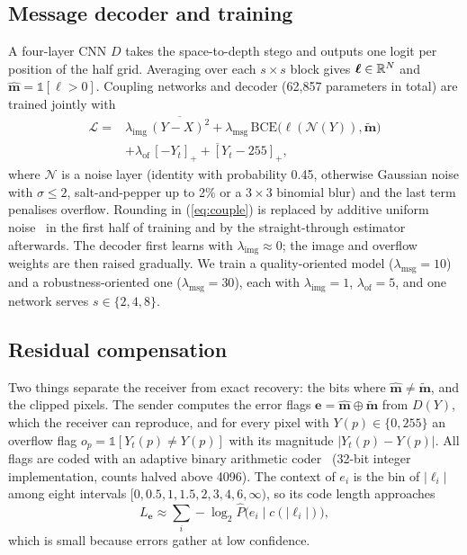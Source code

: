 \subsection{Message decoder and training}
A four-layer CNN $D$ takes the space-to-depth stego and outputs one logit per position of the half grid. Averaging over
each $s\times s$ block gives $\boldsymbol\ell\in\mathbb{R}^N$ and $\hat{\mathbf m}=\mathbb 1[\boldsymbol\ell>0]$. Coupling
networks and decoder (62{,}857 parameters in total) are trained jointly with
\begin{equation}
\begin{aligned}
\mathcal L ={}& \lambda_{\mathrm{img}}\,\overline{(Y-X)^2}
 + \lambda_{\mathrm{msg}}\,\mathrm{BCE}\big(\boldsymbol\ell(\mathcal N(Y)),\tilde{\mathbf m}\big)\\
 &+ \lambda_{\mathrm{of}}\,\overline{[-Y_t]_+ + [Y_t-255]_+},
\end{aligned}
\label{eq:loss}
\end{equation}
where $\mathcal N$ is a noise layer (identity with probability 0.45, otherwise Gaussian noise with
$\sigma\le 2$, salt-and-pepper up to 2\% or a $3\times3$ binomial blur) and the last term penalises overflow. Rounding
in (\ref{eq:couple}) is replaced by additive uniform noise~\cite{balle2017} in the first half of training and by the
straight-through estimator afterwards. The decoder first learns with $\lambda_{\mathrm{img}}\approx0$; the image and
overflow weights are then raised gradually. We train a quality-oriented model ($\lambda_{\mathrm{msg}}=10$) and a
robustness-oriented one ($\lambda_{\mathrm{msg}}=30$), each with $\lambda_{\mathrm{img}}=1$, $\lambda_{\mathrm{of}}=5$, and
one network serves $s\in\{2,4,8\}$.

\subsection{Residual compensation}
Two things separate the receiver from exact recovery: the bits where $\hat{\mathbf m}\neq\tilde{\mathbf m}$, and the
clipped pixels. The sender computes the error flags $\mathbf e=\hat{\mathbf m}\oplus\tilde{\mathbf m}$ from $D(Y)$, which the
receiver can reproduce, and for every pixel with $Y(p)\in\{0,255\}$ an overflow flag
$o_p=\mathbb 1[Y_t(p)\neq Y(p)]$ with its magnitude $|Y_t(p)-Y(p)|$. All flags are coded with an adaptive binary
arithmetic coder~\cite{witten1987ac} (32-bit integer implementation, counts halved above 4096). The context of $e_i$ is the bin of $|\ell_i|$ among eight intervals
$[0,0.5,1,1.5,2,3,4,6,\infty)$, so its code length approaches
\begin{equation}
L_{\mathbf e}\approx\sum_i -\log_2 \hat P\big(e_i \mid c(|\ell_i|)\big),
\end{equation}
which is small because errors gather at low confidence.

